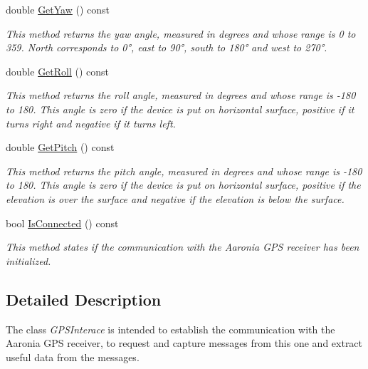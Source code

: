 \begin{DoxyCompactItemize}
\mbox{\label{classGPSInterface_a5443691a26eb05587190cf631ffbcec3}} 
double \hyperlink{classGPSInterface_a5443691a26eb05587190cf631ffbcec3}{Get\+Yaw} () const
\begin{DoxyCompactList}\small\item\em This method returns the yaw angle, measured in degrees and whose range is 0 to 359. North corresponds to 0°, east to 90°, south to 180° and west to 270°. \end{DoxyCompactList}\item 
\mbox{\label{classGPSInterface_a5cb902ccc2165294b4dacc7f660dcb5a}} 
double \hyperlink{classGPSInterface_a5cb902ccc2165294b4dacc7f660dcb5a}{Get\+Roll} () const
\begin{DoxyCompactList}\small\item\em This method returns the roll angle, measured in degrees and whose range is -\/180 to 180. This angle is zero if the device is put on horizontal surface, positive if it turns right and negative if it turns left. \end{DoxyCompactList}\item 
\mbox{\label{classGPSInterface_a27f5655d78068177d901933528f3ac6f}} 
double \hyperlink{classGPSInterface_a27f5655d78068177d901933528f3ac6f}{Get\+Pitch} () const
\begin{DoxyCompactList}\small\item\em This method returns the pitch angle, measured in degrees and whose range is -\/180 to 180. This angle is zero if the device is put on horizontal surface, positive if the elevation is over the surface and negative if the elevation is below the surface. \end{DoxyCompactList}\item 
\mbox{\label{classGPSInterface_a568715247cbcfa261d68a030df7bd1ef}} 
bool \hyperlink{classGPSInterface_a568715247cbcfa261d68a030df7bd1ef}{Is\+Connected} () const
\begin{DoxyCompactList}\small\item\em This method states if the communication with the Aaronia G\+PS receiver has been initialized. \end{DoxyCompactList}\end{DoxyCompactItemize}


\subsection{Detailed Description}
The class {\itshape G\+P\+S\+Interace} is intended to establish the communication with the Aaronia G\+PS receiver, to request and capture messages from this one and extract useful data from the messages. 

